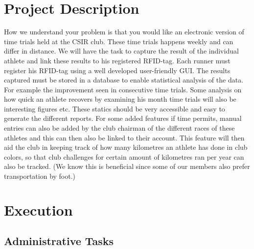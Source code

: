 \documentclass{article}
\begin{document}
\cleardoublepage
\thispagestyle{empty}
\tableofcontents
\newpage

\section{Project Description}
How we understand your problem is that you would like an electronic version of time trials held at the CSIR club. These time trials happens weekly and can differ in distance. We will have the task to capture the result of the individual athlete and link these results to his registered RFID-tag. Each runner must register his RFID-tag using a well developed user-friendly GUI. The results captured must be stored in a database to enable statistical analysis of the data. For example the improvement seen in consecutive time trials. Some analysis on how quick an athlete recovers by examining his month time trials will also be interesting figures etc. These statics should be very accessible and easy to generate the different reports. For some added features if time permits, manual entries can also be added by the club chairman of the different races of these athletes and this can then also be linked to their account. This feature will then aid the club in keeping track of how many kilometres an athlete has done in club colors, so that club challenges for certain amount of kilometres ran per year can also be tracked. (We know this is beneficial since some of our members also prefer transportation by foot.)

\section{Execution}
    \subsection{Administrative Tasks}
\end{document}

